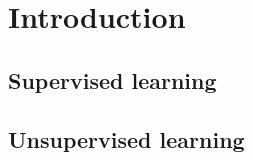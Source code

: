 \documentclass[CS5104-Notes.tex]{subfiles}
\begin{document}
\section{Introduction}


\subsection{Supervised learning}

\subsection{Unsupervised learning}
\end{document}
